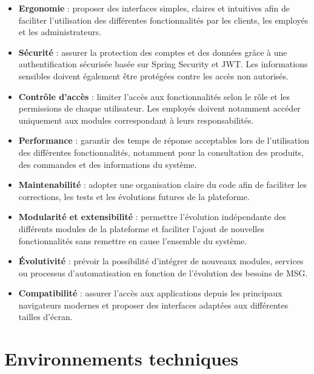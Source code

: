 \begin{itemize}


\item \textbf{Ergonomie} : proposer des interfaces simples, claires et intuitives afin de faciliter l'utilisation des différentes fonctionnalités par les clients, les employés et les administrateurs.

\item \textbf{Sécurité} : assurer la protection des comptes et des données grâce à une authentification sécurisée basée sur Spring Security et \ac{JWT}. Les informations sensibles doivent également être protégées contre les accès non autorisés.

\item \textbf{Contrôle d'accès} : limiter l'accès aux fonctionnalités selon le rôle et les permissions de chaque utilisateur. Les employés doivent notamment accéder uniquement aux modules correspondant à leurs responsabilités.

\item \textbf{Performance} : garantir des temps de réponse acceptables lors de l'utilisation des différentes fonctionnalités, notamment pour la consultation des produits, des commandes et des informations du système.

\item \textbf{Maintenabilité} : adopter une organisation claire du code afin de faciliter les corrections, les tests et les évolutions futures de la plateforme.

\item \textbf{Modularité et extensibilité} : permettre l'évolution indépendante des différents modules de la plateforme et faciliter l'ajout de nouvelles fonctionnalités sans remettre en cause l'ensemble du système.

\item \textbf{Évolutivité} : prévoir la possibilité d'intégrer de nouveaux modules, services ou processus d'automatisation en fonction de l'évolution des besoins de MSG.

\item \textbf{Compatibilité} : assurer l'accès aux applications depuis les principaux navigateurs modernes et proposer des interfaces adaptées aux différentes tailles d'écran.


\end{itemize}




\section{Environnements techniques}

